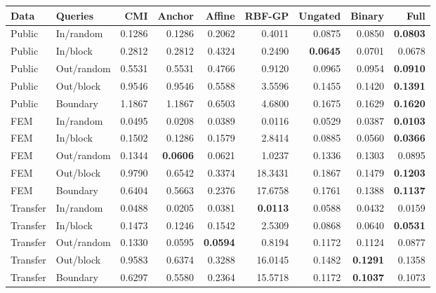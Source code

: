 \begin{tabular}{llrrrrrrr}
\toprule
Data & Queries & CMI & Anchor & Affine & RBF-GP & Ungated & Binary & Full \\
\midrule
Public & In/random & 0.1286 & 0.1286 & 0.2062 & 0.4011 & 0.0875 & 0.0850 & \textbf{0.0803} \\
Public & In/block & 0.2812 & 0.2812 & 0.4324 & 0.2490 & \textbf{0.0645} & 0.0701 & 0.0678 \\
Public & Out/random & 0.5531 & 0.5531 & 0.4766 & 0.9120 & 0.0965 & 0.0954 & \textbf{0.0910} \\
Public & Out/block & 0.9546 & 0.9546 & 0.5588 & 3.5596 & 0.1455 & 0.1420 & \textbf{0.1391} \\
Public & Boundary & 1.1867 & 1.1867 & 0.6503 & 4.6800 & 0.1675 & 0.1629 & \textbf{0.1620} \\
FEM & In/random & 0.0495 & 0.0208 & 0.0389 & 0.0116 & 0.0529 & 0.0387 & \textbf{0.0103} \\
FEM & In/block & 0.1502 & 0.1286 & 0.1579 & 2.8414 & 0.0885 & 0.0560 & \textbf{0.0366} \\
FEM & Out/random & 0.1344 & \textbf{0.0606} & 0.0621 & 1.0237 & 0.1336 & 0.1303 & 0.0895 \\
FEM & Out/block & 0.9790 & 0.6542 & 0.3374 & 18.3431 & 0.1867 & 0.1479 & \textbf{0.1203} \\
FEM & Boundary & 0.6404 & 0.5663 & 0.2376 & 17.6758 & 0.1761 & 0.1388 & \textbf{0.1137} \\
Transfer & In/random & 0.0488 & 0.0205 & 0.0381 & \textbf{0.0113} & 0.0588 & 0.0432 & 0.0159 \\
Transfer & In/block & 0.1473 & 0.1246 & 0.1542 & 2.5309 & 0.0868 & 0.0640 & \textbf{0.0531} \\
Transfer & Out/random & 0.1330 & 0.0595 & \textbf{0.0594} & 0.8194 & 0.1172 & 0.1124 & 0.0877 \\
Transfer & Out/block & 0.9583 & 0.6374 & 0.3288 & 16.0145 & 0.1482 & \textbf{0.1291} & 0.1358 \\
Transfer & Boundary & 0.6297 & 0.5580 & 0.2364 & 15.5718 & 0.1172 & \textbf{0.1037} & 0.1073 \\
\bottomrule
\end{tabular}
